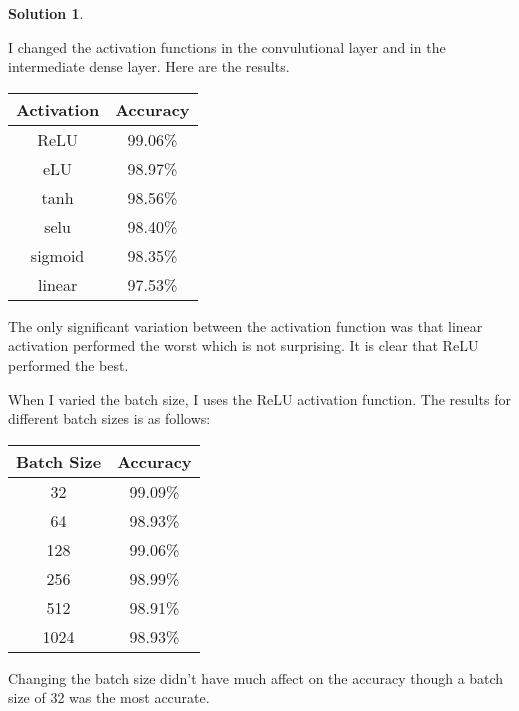\documentclass[12pt]{article}
\theoremstyle{definition}
\newtheorem*{solution*}{Solution}
\begin{document}
\begin{solution*}
\begin{enumerate}[label=\arabic*.,font=\upshape]
			I changed the activation functions in the convulutional layer and in the intermediate dense layer. Here are the results. 
			
			\begin{tabular}{cc}
				Activation & Accuracy \\\hline
				ReLU & 99.06\% \\
				eLU & 98.97\% \\
				tanh & 98.56\% \\
				selu & 98.40\% \\
				sigmoid & 98.35\% \\
				linear & 97.53\% \\
			\end{tabular}
		
		The only significant variation between the activation function was that linear activation performed the worst which is not surprising. It is clear that ReLU performed the best.  
		
		When I varied the batch size, I uses the ReLU activation function. The results for different batch sizes is as follows:
		
		\begin{tabular}{cc}
			Batch Size & Accuracy \\\hline
			32 & 99.09\% \\
			64 & 98.93\% \\
			128 & 99.06\% \\
			256 & 98.99\% \\
			512 & 98.91\% \\
			1024 & 98.93\%
		\end{tabular}
	
		Changing the batch size didn't have much affect on the accuracy though a batch size of 32 was the most accurate. 
		\end{enumerate}
	\end{solution*}
\end{document}

